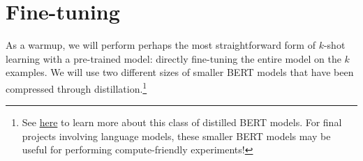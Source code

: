 \section{Fine-tuning}

As a warmup, we will perform perhaps the most straightforward form of $k$-shot learning with a pre-trained model: directly fine-tuning the entire model on the $k$ examples. We will use two different sizes of smaller BERT models that have been compressed through distillation.\footnote{See \href{https://arxiv.org/pdf/1908.08962.pdf}{here} to learn more about this class of distilled BERT models. For final projects involving language models, these smaller BERT models may be useful for performing compute-friendly experiments!}

\begin{enumerate}[label={1.\alph*}]
    
    
    
    
\end{enumerate}